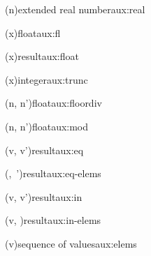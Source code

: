 \begin{auxfunction}{\realOf(n)}{extended real number}{aux:real}

\end{auxfunction}

\begin{auxfunction}{\fl(x)}{float}{aux:fl}

\end{auxfunction}

\begin{auxfunction}{\floatOp(x)}{result}{aux:float}

\end{auxfunction}

\begin{auxfunction}{\trunc(x)}{integer}{aux:trunc}

\end{auxfunction}

\begin{auxfunction}{\floorDiv(n, n')}{float}{aux:floordiv}

\end{auxfunction}

\begin{auxfunction}{\modOp(n, n')}{float}{aux:mod}

\end{auxfunction}

\begin{auxfunction}{\eqOp{\Sigma}(v, v')}{result}{aux:eq}

\end{auxfunction}

\begin{auxfunction}{\eqElems{\Sigma}(, \,')}{result}{aux:eq-elems}

\end{auxfunction}

\begin{auxfunction}{\inOp{\Sigma}(v, v')}{result}{aux:in}

\end{auxfunction}

\begin{auxfunction}{\inElems{\Sigma}(v, )}{result}{aux:in-elems}

\end{auxfunction}

\begin{auxfunction}{\elems(v)}{sequence of values}{aux:elems}

\end{auxfunction}

